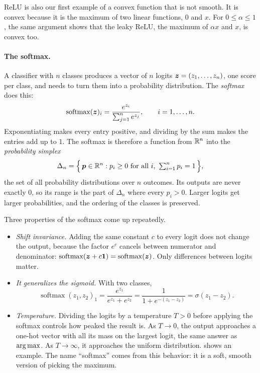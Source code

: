 ReLU is also our first example of a convex function that is not smooth.
It is convex because it is the maximum of two linear functions, $0$ and
$x$. For $0 \le \alpha \le 1$, the same argument shows that the leaky ReLU,
the maximum of $\alpha x$ and $x$, is convex too.

\paragraph{The softmax.}
A classifier with $n$ classes produces a vector of $n$ logits
$\bm{z} = (z_1, \dots, z_n)$, one score per class, and needs to turn them
into a probability distribution. The \emph{softmax} does this:
\[
  \operatorname{softmax}(\bm{z})_i = \frac{e^{z_i}}{\sum_{j=1}^n e^{z_j}},
  \qquad i = 1, \dots, n.
\]
Exponentiating makes every entry positive, and dividing by the sum makes
the entries add up to $1$. The softmax is therefore a function from $\mathbb{R}^n$
into the \emph{probability simplex}
\[
  \Delta_n = \Bigl\{\, \bm{p} \in \mathbb{R}^n : p_i \ge 0 \text{ for all } i,\
  \textstyle\sum_{i=1}^n p_i = 1 \,\Bigr\},
\]
the set of all probability distributions over $n$ outcomes.
Its outputs are never exactly $0$, so its range is the part of $\Delta_n$
where every $p_i > 0$. Larger logits get larger probabilities, and the
ordering of the classes is preserved.

Three properties of the softmax come up repeatedly.
\begin{itemize}
  \item \emph{Shift invariance.} Adding the same constant $c$ to every
    logit does not change the output, because the factor $e^c$ cancels
    between numerator and denominator:
    $\operatorname{softmax}(\bm{z} + c\bm{1}) =
    \operatorname{softmax}(\bm{z})$. Only differences between logits
    matter.
  \item \emph{It generalizes the sigmoid.} With two classes,
    \[
      \operatorname{softmax}(z_1, z_2)_1 = \frac{e^{z_1}}{e^{z_1} + e^{z_2}}
      = \frac{1}{1 + e^{-(z_1 - z_2)}} = \sigma(z_1 - z_2).
    \]
  \item \emph{Temperature.} Dividing the logits by a temperature $T > 0$
    before applying the softmax controls how peaked the result is. As
    $T \to 0$, the output approaches a one-hot vector with all its mass on
    the largest logit, the same answer as $\operatorname*{arg\,max}$. As $T \to \infty$, it
    approaches the uniform distribution. \Cref{fig:ch01-softmax} shows an
    example. The name ``softmax'' comes from this behavior: it is a soft,
    smooth version of picking the maximum.
\end{itemize}

